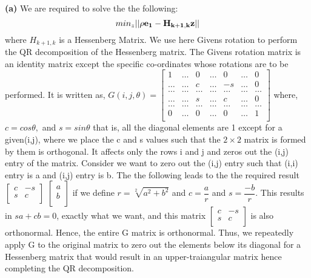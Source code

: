 \documentclass{article}
\renewcommand\part[1]{\vspace{.10in}\textbf{(#1)}}
\begin{document}
  \part{a} We are required to solve the the following:
  \[min_z ||\rho \bf e_1 - \bf H_{k+1,k}\bf z||\]
  where $H_{k+1,k}$ is a Hessenberg Matrix. We use here Givens rotation to perform the QR decomposition of the Hessenberg matrix. The Givens rotation matrix is an identity matrix except the specific co-ordinates whose rotations are to be performed. It is written as, \newline
  $G(i,j,\theta) = \begin{bmatrix} 
	  1 & \dots & 0 & \dots & 0 & \dots & 0 \\
	  \dots & \dots & c & \dots & -s & \dots & 0 \\
	  \dots & \dots & \dots & \dots & \dots & \dots & \dots \\
	  \dots & \dots & s & \dots & c & \dots & 0 \\
	  \dots & \dots & \dots & \dots & \dots & \dots & \dots \\
	  0 & \dots & 0 & \dots & 0 & \dots & 1 \\
  \end{bmatrix}$ where, $c = cos\theta,$ and $s = sin\theta $\newline 
   that is, all the diagonal elements are 1 except for a given(i,j), where we place the c and s values such that the $2 \times 2$ matrix is formed by them is orthogonal. It affects only the rows i and j and zeros out the (i,j) entry of the matrix. Consider we want to zero out the (i,j) entry such that (i,i) entry is a and (i,j) entry is b. The the following leads to the the required result \newline
   $\begin{bmatrix}
	   c & -s \\
	   s & c \\
   \end{bmatrix}$ $\begin{bmatrix}
	   a \\
	   b \\
   \end{bmatrix}$ \newline
   if we define $r = \sqrt[2]{a^2 + b^2}$ and $c = \dfrac{a}{r}$ and $s = \dfrac{-b}{r}$. This results in $sa + cb=0$, exactly what we want, and this matrix $\begin{bmatrix}
	   c & -s \\
	   s & c \\
   \end{bmatrix}$ is also orthonormal.  Hence, the entire G matrix is orthonormal. Thus, we repeatedly apply G to the original matrix to zero out the elements below its diagonal for a Hessenberg matrix that would result in an upper-traiangular matrix hence completing the QR decomposition.\newline
\end{document}
